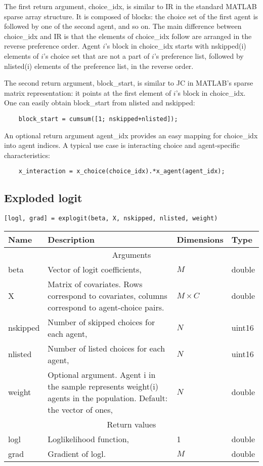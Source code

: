 \documentclass[12pt]{article}
\begin{document}
The first return argument, choice\_idx, is similar to IR in the standard MATLAB sparse array structure. It is composed of blocks: the choice set of the first agent is followed by one of the second agent, and so on.  The main difference between choice\_idx and IR is that the elements of choice\_idx follow are arranged in the reverse preference order. Agent $i$'s block in choice\_idx starts with nskipped(i) elements of $i$'s choice set that are not a part of $i$'s preference list, followed by nlisted(i) elements of the preference list, in the reverse order.

The second return argument, block\_start, is similar to JC in MATLAB's sparse matrix representation: it points at the first element of $i$'s block in choice\_idx. One can easily obtain block\_start from nlisted and nskipped:
\begin{lstlisting}
	block_start = cumsum([1; nskipped+nlisted]);
\end{lstlisting}

An optional return argument agent\_idx provides an easy mapping for choice\_idx into agent indices. A typical use case is interacting choice and agent-specific characteristics:
\begin{lstlisting}
	x_interaction = x_choice(choice_idx).*x_agent(agent_idx);
\end{lstlisting}

\clearpage


\subsection{Exploded logit}
\texttt{[logl, grad] = explogit(beta, X, nskipped, nlisted, weight)}

\begin{tabular}{lp{}ll}\\\hline\hline
	Name 		& Description & Dimensions & Type\\\hline
	\multicolumn{4}{c}{Arguments}\\\hline
	beta 		& Vector of logit coefficients, & $M$ & double\\
	X 			& Matrix of covariates. Rows correspond to covariates, columns correspond to agent-choice pairs. & $M\times C$ & double \\
	nskipped 	& Number of skipped choices for each agent, & $N$ & uint16 \\
	nlisted 	& Number of listed choices for each agent, & $N$ & uint16 \\
	weight		& Optional argument. Agent i in the sample represents weight(i) agents in the population. Default: the vector of ones, & $N$ & double\\\hline
	
	\multicolumn{4}{c}{Return values}\\\hline
	logl		& Loglikelihood function, & 1 & double\\
	grad		& Gradient of logl. & $M$ & double\\\hline\hline
\end{tabular}\\
\end{document}
